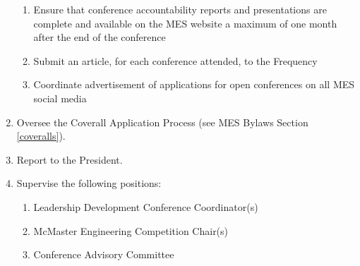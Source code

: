 \begin{enumerate}
  \begin{enumerate}
   \item
    Ensure that conference accountability reports and presentations are complete and available on the MES website a maximum of one month after the end of the conference
   \item
    Submit an article, for each conference attended, to the Frequency
   \item
    Coordinate advertisement of applications for open conferences on all MES social media
  \end{enumerate}
 \item
  Oversee the Coverall Application Process (see MES Bylaws Section \ref{coveralls}).
 \item
  Report to the President.
 \item
  Supervise the following positions:

  \begin{enumerate}
   \item
    Leadership Development Conference Coordinator(s)
   \item
    McMaster Engineering Competition Chair(s)
   \item
    Conference Advisory Committee
  \end{enumerate}
\end{enumerate}